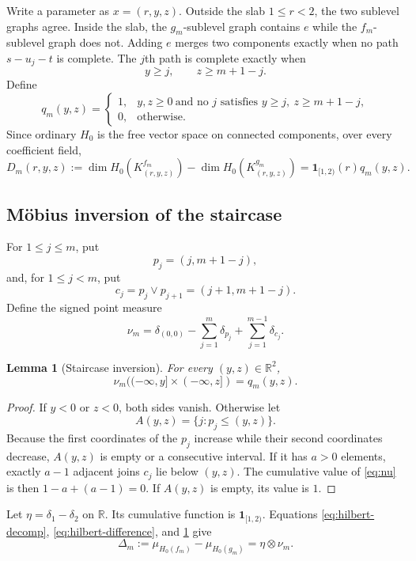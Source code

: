 \documentclass[11pt]{article}
\newtheorem{lemma}[lemma]{Lemma}
\theoremstyle{definition}
\newcommand{\R}{\mathbb{R}}
\newcommand{\1}{\mathbf{1}}
\newcommand{\join}{\mathbin{\vee}}
\begin{document}
Write a parameter as $x=(r,y,z)$.  Outside the slab $1\leq r<2$, the two
sublevel graphs agree.  Inside the slab, the $g_m$-sublevel graph contains
$e$ while the $f_m$-sublevel graph does not.  Adding $e$ merges two
components exactly when no path $s-u_j-t$ is complete.  The $j$th path is
complete exactly when
\[
  y\geq j,\qquad z\geq m+1-j.
\]
Define
\[
q_m(y,z)=
\begin{cases}
1,&y,z\geq0\ \text{and no }j\text{ satisfies }
       y\geq j,\ z\geq m+1-j,\\
0,&\text{otherwise}.
\end{cases}
\]
Since ordinary $H_0$ is the free vector space on connected components, over
every coefficient field,
\begin{equation}\label{eq:hilbert-difference}
  D_m(r,y,z)
  :=\dim H_0(K^{f_m}_{(r,y,z)})
     -\dim H_0(K^{g_m}_{(r,y,z)})
  =\1_{[1,2)}(r)q_m(y,z).
\end{equation}

\subsection{Möbius inversion of the staircase}

For $1\leq j\leq m$, put
\[
  p_j=(j,m+1-j),
\]
and, for $1\leq j<m$, put
\[
  c_j=p_j\join p_{j+1}=(j+1,m+1-j).
\]
Define the signed point measure
\begin{equation}\label{eq:nu}
  \nu_m=\delta_{(0,0)}
        -\sum_{j=1}^{m}\delta_{p_j}
        +\sum_{j=1}^{m-1}\delta_{c_j}.
\end{equation}

\begin{lemma}[Staircase inversion]\label{lem:staircase}
For every $(y,z)\in\R^2$,
\[
  \nu_m((-\infty,y]\times(-\infty,z])=q_m(y,z).
\]
\end{lemma}

\begin{proof}
If $y<0$ or $z<0$, both sides vanish.  Otherwise let
\[
  A(y,z)=\{j:p_j\leq(y,z)\}.
\]
Because the first coordinates of the $p_j$ increase while their second
coordinates decrease, $A(y,z)$ is empty or a consecutive interval.  If it
has $a>0$ elements, exactly $a-1$ adjacent joins $c_j$ lie below $(y,z)$.
The cumulative value of \eqref{eq:nu} is then
$1-a+(a-1)=0$.  If $A(y,z)$ is empty, its value is $1$.
\end{proof}

Let $\eta=\delta_1-\delta_2$ on $\R$.  Its cumulative function is
$\1_{[1,2)}$.  Equations \eqref{eq:hilbert-decomp},
\eqref{eq:hilbert-difference}, and \cref{lem:staircase} give
\begin{equation}\label{eq:delta-tensor}
  \Delta_m
  :=\mu_{H_0(f_m)}-\mu_{H_0(g_m)}
  =\eta\otimes\nu_m.
\end{equation}
\end{document}
